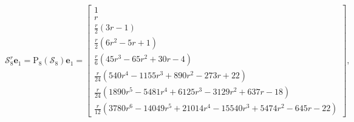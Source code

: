 \begin{example}
\begin{displaymath}
\mathcal{S}_{8}^{r}\boldsymbol{e}_{1} = \operatorname{P_{ 8 }}{\left (\mathcal{S}_{ 8 } \right )}\boldsymbol{e}_{1}  =\left[\begin{matrix}1\\r\\\frac{r}{2} \left(3 r - 1\right)\\\frac{r}{2} \left(6 r^{2} - 5 r + 1\right)\\\frac{r}{6} \left(45 r^{3} - 65 r^{2} + 30 r - 4\right)\\\frac{r}{24} \left(540 r^{4} - 1155 r^{3} + 890 r^{2} - 273 r + 22\right)\\\frac{r}{24} \left(1890 r^{5} - 5481 r^{4} + 6125 r^{3} - 3129 r^{2} + 637 r - 18\right)\\\frac{r}{12} \left(3780 r^{6} - 14049 r^{5} + 21014 r^{4} - 15540 r^{3} + 5474 r^{2} - 645 r - 22\right)\end{matrix}\right],

\end{displaymath}
\end{example}
